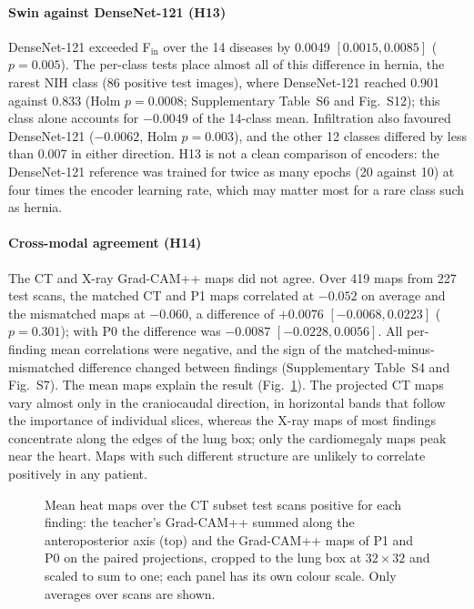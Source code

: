 \begin{table}[htbp]
\centering\footnotesize
\caption{Study III hypotheses: differences of the seed ensembles with 95\,\% bootstrap intervals (\num{10000} resamples). Holm: H11 with the
two H12 contrasts. The P0 row of H14 is descriptive.}
\label{tab:xm_hyp}
\end{table}

\paragraph{Swin against DenseNet-121 (H13)} DenseNet-121 exceeded F$_\mathrm{in}$ over the 14 diseases by 0.0049 $[0.0015, 0.0085]$
($p=0.005$). The per-class tests place almost all of this difference in hernia, the rarest NIH class (86 positive test images), where
DenseNet-121 reached 0.901 against 0.833 (Holm $p=0.0008$; Supplementary Table~S6 and Fig.~S12); this class alone accounts for $-0.0049$ of the
14-class mean. Infiltration also favoured DenseNet-121 ($-0.0062$, Holm $p=0.003$), and the other 12 classes differed by less than 0.007 in
either direction. H13 is not a clean comparison of encoders: the DenseNet-121 reference was trained for twice as many epochs (20 against
10) at four times the encoder learning rate, which may matter most for a rare class such as hernia.

\paragraph{Cross-modal agreement (H14)} The CT and X-ray Grad-CAM++ maps did not agree. Over 419 maps from 227 test scans, the matched CT and P1
maps correlated at $-0.052$ on average and the mismatched maps at $-0.060$, a difference of $+0.0076$ $[-0.0068, 0.0223]$ ($p=0.301$); with
P0 the difference was $-0.0087$ $[-0.0228, 0.0056]$. All per-finding mean correlations were negative, and the sign of the matched-minus-mismatched
difference changed between findings (Supplementary Table~S4 and Fig.~S7). The mean maps explain the result (Fig.~\ref{fig:xm_maps}). The projected
CT maps vary almost only in the craniocaudal direction, in horizontal bands that follow the importance of individual slices, whereas the X-ray
maps of most findings concentrate along the edges of the lung box; only the cardiomegaly maps peak near the heart. Maps with such different
structure are unlikely to correlate positively in any patient.

\begin{figure}[htbp]
\centering
{}
\caption{Mean heat maps over the CT subset test scans positive for each finding: the teacher's Grad-CAM++ summed along the anteroposterior axis
(top) and the Grad-CAM++ maps of P1 and P0 on the paired projections, cropped to the lung box at $32\times32$ and scaled to sum to one; each
panel has its own colour scale. Only averages over scans are shown.}
\label{fig:xm_maps}
\end{figure}

